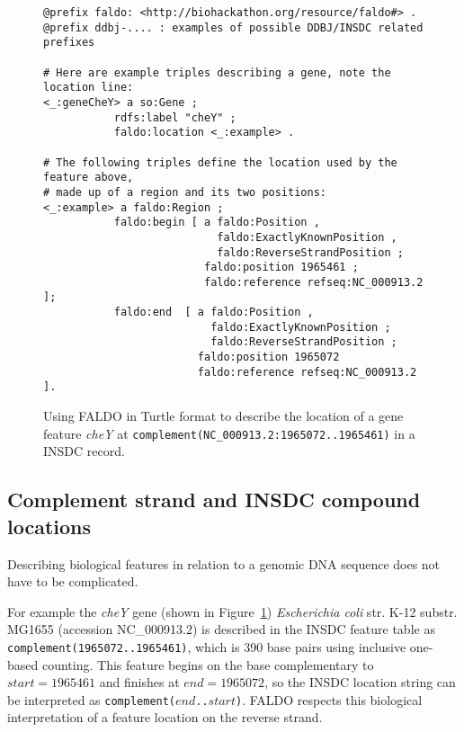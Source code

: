 %
\begin{figure}
\begin{shaded}
\small
\begin{verbatim} 
@prefix faldo: <http://biohackathon.org/resource/faldo#> .
@prefix ddbj-.... : examples of possible DDBJ/INSDC related prefixes

# Here are example triples describing a gene, note the location line:
<_:geneCheY> a so:Gene ;
           rdfs:label "cheY" ;
           faldo:location <_:example> .

# The following triples define the location used by the feature above,
# made up of a region and its two positions:
<_:example> a faldo:Region ;
           faldo:begin [ a faldo:Position ,
                           faldo:ExactlyKnownPosition ,
                           faldo:ReverseStrandPosition ;
                         faldo:position 1965461 ;
                         faldo:reference refseq:NC_000913.2 ];
           faldo:end  [ a faldo:Position ,
                          faldo:ExactlyKnownPosition ;
                          faldo:ReverseStrandPosition ;
                        faldo:position 1965072
                        faldo:reference refseq:NC_000913.2 ].
\end{verbatim}
\end{shaded}
\caption{Using FALDO in Turtle\cite{TurtleFormatSpec} format to describe the location of a
gene feature \textit{cheY} at \texttt{complement(NC\_000913.2:1965072..1965461)} in a INSDC record.}
\label{fig:insdcComplement}
\end{figure}


\subsection*{Complement strand and INSDC compound locations}

Describing biological features in relation to a genomic DNA sequence does not have to be complicated.

For example the \textit{cheY} gene (shown in Figure~\ref{fig:insdcComplement})
\textit{Escherichia coli} str. K-12 substr. MG1655 (accession NC\_000913.2)
is described in the INSDC feature table as \texttt{complement(1965072..1965461)},
which is 390 base pairs using inclusive one-based counting.
This feature begins on the base complementary to $start = 1965461$
and finishes at $end = 1965072$, so the INSDC location string
can be interpreted as \texttt{complement($end$..$start$)}.
FALDO respects this biological interpretation of a feature location
on the reverse strand.

